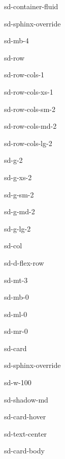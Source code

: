 \documentclass[letterpaper,10pt,english]{jupyterBook}
\begin{document}
\begin{sphinxuseclass}{sd-container-fluid}
\begin{sphinxuseclass}{sd-sphinx-override}
\begin{sphinxuseclass}{sd-mb-4}
\begin{sphinxuseclass}{sd-row}
\begin{sphinxuseclass}{sd-row-cols-1}
\begin{sphinxuseclass}{sd-row-cols-xs-1}
\begin{sphinxuseclass}{sd-row-cols-sm-2}
\begin{sphinxuseclass}{sd-row-cols-md-2}
\begin{sphinxuseclass}{sd-row-cols-lg-2}
\begin{sphinxuseclass}{sd-g-2}
\begin{sphinxuseclass}{sd-g-xs-2}
\begin{sphinxuseclass}{sd-g-sm-2}
\begin{sphinxuseclass}{sd-g-md-2}
\begin{sphinxuseclass}{sd-g-lg-2}
\begin{sphinxuseclass}{sd-col}
\begin{sphinxuseclass}{sd-d-flex-row}
\begin{sphinxuseclass}{sd-mt-3}
\begin{sphinxuseclass}{sd-mb-0}
\begin{sphinxuseclass}{sd-ml-0}
\begin{sphinxuseclass}{sd-mr-0}
\begin{sphinxuseclass}{sd-card}
\begin{sphinxuseclass}{sd-sphinx-override}
\begin{sphinxuseclass}{sd-w-100}
\begin{sphinxuseclass}{sd-shadow-md}
\begin{sphinxuseclass}{sd-card-hover}
\begin{sphinxuseclass}{sd-text-center}
\begin{sphinxuseclass}{sd-card-body}
\end{sphinxuseclass}
\end{sphinxuseclass}
\end{sphinxuseclass}
\end{sphinxuseclass}
\end{sphinxuseclass}
\end{sphinxuseclass}
\end{sphinxuseclass}
\end{sphinxuseclass}
\end{sphinxuseclass}
\end{sphinxuseclass}
\end{sphinxuseclass}
\end{sphinxuseclass}
\end{sphinxuseclass}



\end{sphinxuseclass}
\end{sphinxuseclass}
\end{sphinxuseclass}
\end{sphinxuseclass}
\end{sphinxuseclass}
\end{sphinxuseclass}
\end{sphinxuseclass}
\end{sphinxuseclass}
\end{sphinxuseclass}
\end{sphinxuseclass}
\end{sphinxuseclass}
\end{sphinxuseclass}
\end{sphinxuseclass}
\end{sphinxuseclass}
\end{document}

